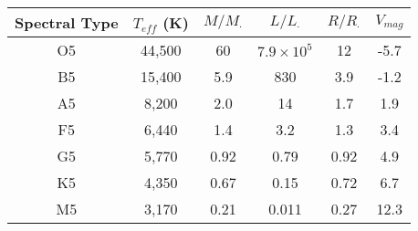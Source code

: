 \begin{fancybox}{}
	\begin{center}
		\begin{tabular}{c|c|c|c|c|c}
			Spectral Type & $T_{eff}$ (K) & $M/M_\cdot$ & $L/L_\cdot$ & $R/R_\cdot$ & $V_{mag}$ \\
			\hline
			O5 & 44,500 & 60 & $7.9\times 10^5$ & 12 &-5.7 \\
			B5 & 15,400 & 5.9 & 830 & 3.9 & -1.2 \\
			A5 & 8,200 & 2.0 & 14 & 1.7 & 1.9 \\
			F5 & 6,440 & 1.4 & 3.2 & 1.3 & 3.4 \\
			G5 & 5,770 & 0.92 & 0.79 & 0.92 & 4.9 \\
			K5 & 4,350 & 0.67 & 0.15 & 0.72 & 6.7 \\
			M5 & 3,170 & 0.21 & 0.011 & 0.27 & 12.3 \\
		\end{tabular}
	\end{center}
\end{fancybox}



